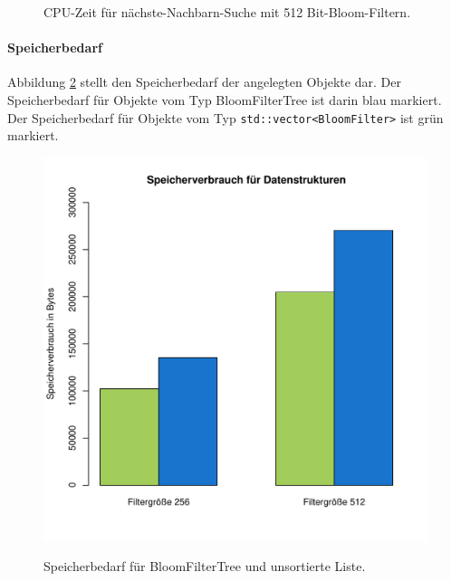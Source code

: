 \begin{figure}[hptb]
	\caption[CPU-Zeit für 3-nächste-Nachbarn-Suche mit 512 Bit-Bloom-Filtern]{CPU-Zeit für nächste-Nachbarn-Suche mit 512 Bit-Bloom-Filtern.}\label{fig:pic16}
\end{figure}
\paragraph*{Speicherbedarf}
Abbildung \ref{fig:pic17} stellt den Speicherbedarf der angelegten Objekte dar. Der Speicherbedarf für Objekte vom Typ BloomFilterTree ist darin blau markiert. Der Speicherbedarf für Objekte vom Typ \texttt{std::vector<BloomFilter>} ist grün markiert. 
\begin{figure}[hptb]
	\centering
	\includegraphics[scale=0.7]{pictures/mem.pdf}\\
	\caption[Speicherbedarf für BloomFilterTree und unsortierte Liste]{Speicherbedarf für BloomFilterTree und unsortierte Liste.}\label{fig:pic17} 
\end{figure}	
